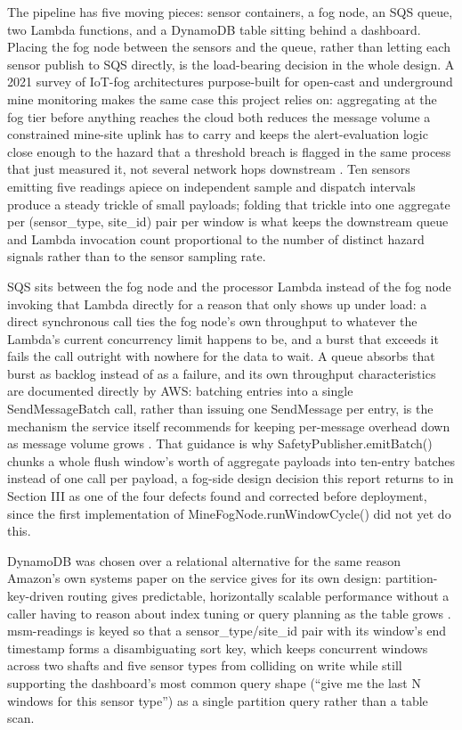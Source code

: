\documentclass[conference]{IEEEtran}
\begin{document}
The pipeline has five moving pieces: sensor containers, a fog node, an SQS queue, two Lambda functions, and a DynamoDB table sitting behind a dashboard. Placing the fog node between the sensors and the queue, rather than letting each sensor publish to SQS directly, is the load-bearing decision in the whole design. A 2021 survey of IoT-fog architectures purpose-built for open-cast and underground mine monitoring makes the same case this project relies on: aggregating at the fog tier before anything reaches the cloud both reduces the message volume a constrained mine-site uplink has to carry and keeps the alert-evaluation logic close enough to the hazard that a threshold breach is flagged in the same process that just measured it, not several network hops downstream \cite{ref5}. Ten sensors emitting five readings apiece on independent sample and dispatch intervals produce a steady trickle of small payloads; folding that trickle into one aggregate per (sensor\_type, site\_id) pair per window is what keeps the downstream queue and Lambda invocation count proportional to the number of distinct hazard signals rather than to the sensor sampling rate.

SQS sits between the fog node and the processor Lambda instead of the fog node invoking that Lambda directly for a reason that only shows up under load: a direct synchronous call ties the fog node's own throughput to whatever the Lambda's current concurrency limit happens to be, and a burst that exceeds it fails the call outright with nowhere for the data to wait. A queue absorbs that burst as backlog instead of as a failure, and its own throughput characteristics are documented directly by AWS: batching entries into a single SendMessageBatch call, rather than issuing one SendMessage per entry, is the mechanism the service itself recommends for keeping per-message overhead down as message volume grows \cite{ref6}. That guidance is why SafetyPublisher.emitBatch() chunks a whole flush window's worth of aggregate payloads into ten-entry batches instead of one call per payload, a fog-side design decision this report returns to in Section III as one of the four defects found and corrected before deployment, since the first implementation of MineFogNode.runWindowCycle() did not yet do this.

DynamoDB was chosen over a relational alternative for the same reason Amazon's own systems paper on the service gives for its own design: partition-key-driven routing gives predictable, horizontally scalable performance without a caller having to reason about index tuning or query planning as the table grows \cite{ref7}. msm-readings is keyed so that a sensor\_type/site\_id pair with its window's end timestamp forms a disambiguating sort key, which keeps concurrent windows across two shafts and five sensor types from colliding on write while still supporting the dashboard's most common query shape (``give me the last N windows for this sensor type'') as a single partition query rather than a table scan.
\end{document}

